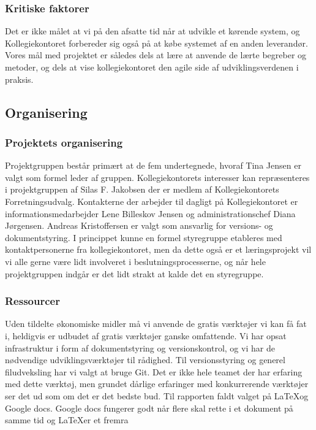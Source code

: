 \documentclass[12pt, a4paper]{report}
\begin{document}
\subsubsection{Kritiske faktorer}
Det er ikke målet at vi på den afsatte tid når at udvikle et kørende system, og Kollegiekontoret forbereder sig også på at købe systemet af en anden leverandør. Vores mål med projektet er således dels at lære at anvende de lærte begreber og metoder, og dels at vise kollegiekontoret den agile side af udviklingsverdenen i praksis.

\subsection{Organisering}
\subsubsection{Projektets organisering}
Projektgruppen består primært at de fem undertegnede, hvoraf Tina Jensen er valgt som formel leder af gruppen. Kollegiekontorets interesser kan repræsenteres i projektgruppen af Silas F. Jakobsen der er medlem af Kollegiekontorets Forretningsudvalg. Kontakterne der arbejder til dagligt på Kollegiekontoret er informationsmedarbejder Lene Billeskov Jensen og administrationschef Diana Jørgensen. Andreas Kristoffersen er valgt som ansvarlig for versions- og dokumentstyring.
I princippet kunne en formel styregruppe etableres med kontaktpersonerne fra kollegiekontoret, men da dette også er et læringsprojekt vil vi alle gerne være lidt involveret i beslutningsprocesserne, og når hele projektgruppen indgår er det lidt strakt at kalde det en styregruppe.

\subsubsection{Ressourcer}
Uden tildelte økonomiske midler må vi anvende de gratis værktøjer vi kan få fat i, heldigvis er udbudet af gratis værktøjer ganske omfattende. Vi har opsat infrastruktur i form af dokumentstyring og versionskontrol, og vi har de nødvendige udviklingsværktøjer til rådighed.
Til versionsstyring og generel filudveksling har vi valgt at bruge Git. Det er ikke hele teamet der har erfaring med dette værktøj, men grundet dårlige erfaringer med konkurrerende værktøjer ser det ud som om det er det bedste bud.
Til rapporten faldt valget på \LaTeX og Google docs. Google docs fungerer godt når flere skal rette i et dokument på samme tid og \LaTeX er et fremra
\end{document}
